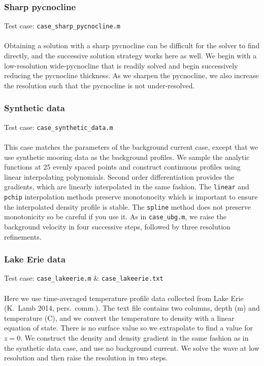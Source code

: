 \documentclass[letterpaper]{article}
\begin{document}
\subsubsection{Sharp pycnocline}
Test case: \verb"case_sharp_pycnocline.m" \\\\
Obtaining a solution with a sharp pycnocline can be difficult for the solver to find directly, and the successive solution strategy works here as well.
We begin with a low-resolution wide-pycnocline that is readily solved and begin successively reducing the pycnocline thickness.
As we sharpen the pycnocline, we also increase the resolution such that the pycnocline is not under-resolved.

\subsubsection{Synthetic data}
Test case: \verb"case_synthetic_data.m" \\\\
This case matches the parameters of the background current case, except that we use synthetic mooring data as the background profiles.
We sample the analytic functions at 25 evenly spaced points and construct continuous profiles using linear interpolating polynomials.
Second order differentiation provides the gradients, which are linearly interpolated in the same fashion.
The \verb+linear+ and \verb+pchip+ interpolation methods preserve monotonocity which is important to ensure the interpolated density profile is stable.
The \verb+spline+ method does not preserve monotonicity so be careful if you use it.
As in \verb"case_ubg.m", we raise the background velocity in four successive steps, followed by three resolution refinements.

\subsubsection{Lake Erie data}
Test case: \verb"case_lakeerie.m" \&  \verb"case_lakeerie.txt" \\\\
Here we use time-averaged temperature profile data collected from Lake Erie (K.~Lamb 2014, pers.~comm.).
The text file contains two columns, depth (m) and temperature (\textdegree C), and we convert the temperature to density with a linear equation of state.
There is no surface value so we extrapolate to find a value for $z=0$.
We construct the density and density gradient in the same fashion as in the synthetic data case, and use no background current.
We solve the wave at low resolution and then raise the resolution in two steps.
\end{document}
